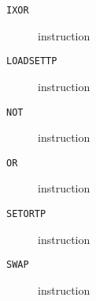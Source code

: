 \clearpage
\begin{description}
\item[\texttt{IXOR}] instruction\\

\end{description}
\clearpage
\begin{description}
\item[\texttt{LOADSETTP}] instruction\\

\end{description}
\clearpage
\begin{description}
\item[\texttt{NOT}] instruction\\

\end{description}
\clearpage
\begin{description}
\item[\texttt{OR}] instruction\\

\end{description}
\clearpage
\begin{description}
\item[\texttt{SETORTP}] instruction\\

\end{description}
\clearpage
\begin{description}
\item[\texttt{SWAP}] instruction\\

\end{description}
\clearpage
